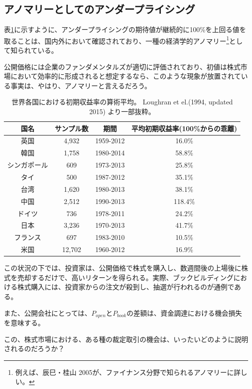 \documentclass{jsarticle}
\begin{document}
\subsection{アノマリーとしてのアンダープライシング}
表\ref{around_world}に示すように、アンダープライシングの期待値が継続的に100\%を上回る値を取ることは、国内外において確認されており、一種の経済学的アノマリー\footnote[7]{例えば、辰巳・桂山 2005\cite{tatsumi}が、ファイナンス分野で知られるアノマリーに詳しい。}として知られている。 \par
公開価格には企業のファンダメンタルズが適切に評価されており、初値は株式市場において効率的に形成されると想定するなら、このような現象が放置されている事実は、やはり、アノマリーと言えるだろう。\par

\begin{table}[h]
	\caption{世界各国における初期収益率の算術平均。
	Loughran et el.(1994, updated 2015) \cite{Loughran}より一部抜粋。}
	\label{around_world}
	\centering
	\begin{tabular}{cccc}
		\hline
		国名&サンプル数&期間&平均初期収益率(100\%からの乖離) \\
		\hline \hline
		英国&4,932&1959-2012&16.0\% \\
		韓国&1,758&1980-2014& 58.8\% \\
		シンガポール&609&1973-2013&25.8\% \\
		タイ&500&1987-2012&35.1\%\\
		台湾 &1,620 &1980-2013&38.1\% \\
		中国&2,512&1990-2013&118.4\%\\
		ドイツ&736&1978-2011&24.2\% \\
		日本&3,236&1970-2013&41.7\% \\
		フランス & 697 & 1983-2010 & 10.5\% \\
		米国&12,702&1960-2012&16.9\%\\
		\hline
	\end{tabular}
	\end{table}
	 \par

この状況の下では、投資家は、公開価格で株式を購入し、数週間後の上場後に株式を売却するだけで、高いリターンを得られる。実際、ブックビルディングにおける株式購入には、投資家からの注文が殺到し、抽選が行われるのが通例である。\par
また、公開会社にとっては、$P_{open}$と$P_{book}$の差額は、資金調達における機会損失を意味する。 \\ \par
この、株式市場における、ある種の裁定取引の機会は、いったいどのように説明されるのだろうか？
\end{document}
